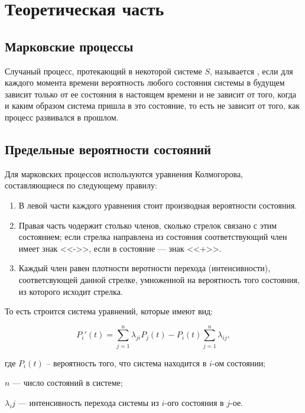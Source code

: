 \chapter{Теоретическая часть}

\section{Марковские процессы}

Случаный процесс, протекающий в некоторой системе $S$, называется
, если для каждого момента времени вероятность любого состояния
системы в будущем зависит только от ее состояния в настоящем времени и не
зависит от того, когда и каким образом система пришла в это состояние, то есть
не зависит от того, как процесс развивался в прошлом.

\section{Предельные вероятности состояний}

Для марковских процессов используются уравнения Колмогорова, составляющиеся по
следующему правилу:

\begin{enumerate}
    \item В левой части каждого уравнения стоит производная вероятности
        состояния.
    \item Правая часть чодержит столько членов, сколько стрелок связано с этим
        состоянием; если стрелка направлена из состояния соответствующий член
        имеет знак <<->>, если в состояние --- знак <<+>>.
    \item Каждый член равен плотности веротности перехода (интенсивности),
        соответсвующей данной стрелке, умноженной на вероятность того состояния,
        из которого исходит стрелка.
\end{enumerate}

То есть строится система уравнений, которые имеют вид:

\begin{equation}
    P_i'(t) = \sum\limits_{j=1}^{n} \lambda_{ji}P_j(t) - P_i(t)
    \sum\limits_{j=1}^{n} \lambda_{ij},
\end{equation}

где $P_i(t)$ -- вероятность того, что система находится в $i$-ом состоянии;

$n$ --- число состояний в системе;

$\lambda_ij$ --- интенсивность перехода системы из $i$-ого состояния в $j$-ое.

